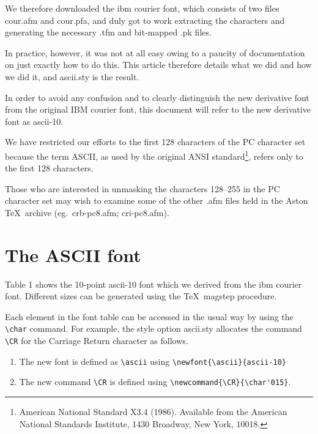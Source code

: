 We therefore downloaded the {\sc ibm courier} font, which consists of
two files {\sc cour.afm} and {\sc cour.pfa}, and duly got to work extracting
the characters and generating the necessary {\sc .tfm} and bit-mapped
{\sc .pk} files.

In practice, however, it was not at all easy owing to a paucity of
documentation on just exactly how to do this.
This article therefore details what we did and how we did it, and {\sc ascii.sty} is the result.

In order to avoid any confusion and to clearly distinguish
the new derivative font from the original IBM {\sc courier} font, this 
document will refer to the new derivative font as {\sc ascii}-10.

We have restricted our efforts to the first 128 characters of the PC character set because the term ASCII, as used by the original ANSI
standard\footnote{American National Standard X3.4 (1986). Available from the American National Standards Institute, 1430 Broadway, New York, 10018.}, refers only to the first 128 characters.


Those who are interested in unmasking the characters 128--255 in the PC character set may wish to examine some of the other {\sc .afm} files
 held in the Aston \TeX\ archive  (eg.\ {\sc crb-pc8.afm};
{\sc cri-pc8.afm}).



\section{The ASCII font}

Table 1 shows the 10-point {\sc ascii-10} font which we derived from
the {\sc ibm courier} font.
Different sizes can be generated using the \TeX\ magstep  procedure.

Each element in the font table can be accessed in the usual way by using
the \verb!\char! command.
For example, the style option {\sc ascii.sty} allocates  the
command \verb!\CR! for the  Carriage Return character as
 follows.



\begin{enumerate}
\item The new font is defined as \verb!\ascii! using
       \verb!\newfont{\ascii}{ascii-10}!

\item The new command  \verb!\CR! is defined  using
 \verb!\newcommand{\CR}{\char'015}!.

\end{enumerate}


